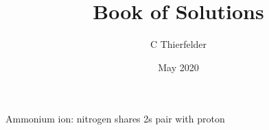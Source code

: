 \documentclass[10pt,a4paper]{book}
\title{Book of Solutions}
\author{C Thierfelder}
\date{May 2020}
\begin{document}
Ammonium ion: nitrogen shares 2s pair with proton
\end{document}
